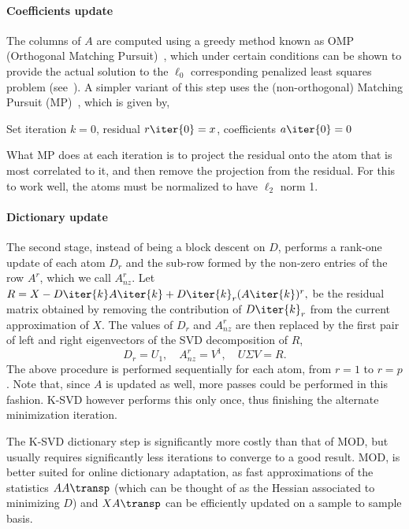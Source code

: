 \documentclass[a4paper]{IEEEtran}
\begin{document}
\paragraph{Coefficients update} The columns of $A$ are computed using a greedy method known as OMP (Orthogonal Matching Pursuit)~\cite{omp}, which   under certain conditions can be shown to provide the actual solution to the $\ell_0$ corresponding penalized least squares problem (see~\cite{tropp04?}). A simpler variant of this step uses the (non-orthogonal) Matching Pursuit (MP)~\cite{mp}, which is given by, 
\begin{algorithm}[ht]
Set iteration $k=0$, residual $r\iter{0}=x$, coefficients $a\iter{0}=0$\;
\label{alg:omp}
\end{algorithm}
What MP does at each iteration is to project the residual onto the atom that is most correlated to it, and then remove the projection from the residual. For this to work well, the atoms must be normalized to have $\ell_2$ norm 1.

\paragraph{Dictionary update} The second stage, instead of being a block descent on $D$, performs a rank-one update of each atom $D_r$ and the sub-row formed by the non-zero entries of the row $A^r$, which we call $A^r_{nz}$. Let $R = X - D\iter{k}A\iter{k} + D\iter{k}_r(A\iter{k})^r,$ be the residual matrix obtained by removing the contribution of $D\iter{k}_r$ from the current approximation of $X$. The values of $D_r$ and $A_{nz}^r$ are then replaced by the first pair of left and right eigenvectors of the SVD decomposition of $R$, 
\begin{equation}
D_r = U_1,\quad A_{nz}^r=V^1,\quad U\Sigma V=R.
\label{eq:ksvd3}
\end{equation}
The above procedure is performed sequentially for each atom, from $r=1$ to $r=p$. Note that, since $A$ is updated as well, more passes could be performed in this fashion. K-SVD however performs this only once, thus finishing the alternate minimization iteration.

The K-SVD dictionary step is significantly more costly than that of MOD, but usually requires significantly less iterations to converge to a good result. MOD, is better suited for online dictionary adaptation, as fast approximations of the statistics $AA\transp$ (which can be thought of as the Hessian associated to minimizing $D$)  and $XA\transp$ can be efficiently updated on a sample to sample basis.
\end{document}

